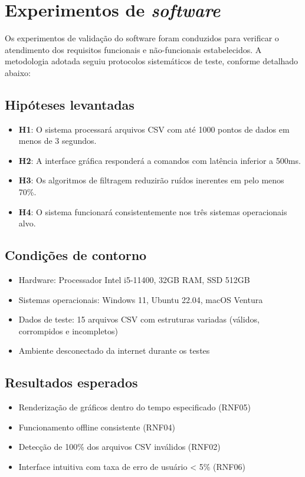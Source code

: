 \section{Experimentos de \textit{software}}

Os experimentos de validação do software foram conduzidos para verificar o atendimento dos requisitos funcionais e não-funcionais estabelecidos. A metodologia adotada seguiu protocolos sistemáticos de teste, conforme detalhado abaixo:

\subsection{Hipóteses levantadas}
\begin{itemize}
    \item \textbf{H1}: O sistema processará arquivos CSV com até 1000 pontos de dados em menos de 3 segundos.
    \item \textbf{H2}: A interface gráfica responderá a comandos com latência inferior a 500ms.
    \item \textbf{H3}: Os algoritmos de filtragem reduzirão ruídos inerentes em pelo menos 70\%.
    \item \textbf{H4}: O sistema funcionará consistentemente nos três sistemas operacionais alvo.
\end{itemize}

\subsection{Condições de contorno}
\begin{itemize}
    \item Hardware: Processador Intel i5-11400, 32GB RAM, SSD 512GB
    \item Sistemas operacionais: Windows 11, Ubuntu 22.04, macOS Ventura
    \item Dados de teste: 15 arquivos CSV com estruturas variadas (válidos, corrompidos e incompletos)
    \item Ambiente desconectado da internet durante os testes
\end{itemize}

\subsection{Resultados esperados}
\begin{itemize}
    \item Renderização de gráficos dentro do tempo especificado (RNF05)
    \item Funcionamento offline consistente (RNF04)
    \item Detecção de 100\% dos arquivos CSV inválidos (RNF02)
    \item Interface intuitiva com taxa de erro de usuário < 5\% (RNF06)
\end{itemize}

